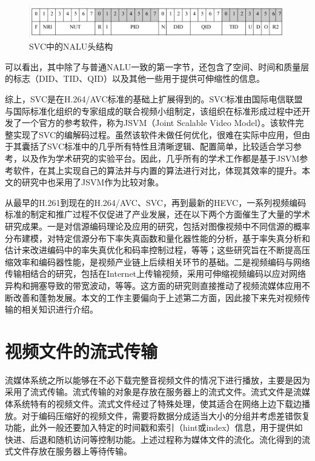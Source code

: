 \begin{figure}[h]
	\centering
	\includegraphics[width = 1.0\linewidth]{clip/05.png}
	\caption{SVC中的NALU头结构\label{fig:05}}
\end{figure}

可以看出，其中除了与普通NALU一致的第一字节，还包含了空间、时间和质量层的标志（DID、TID、QID）以及其他一些用于提供可伸缩性的信息。

综上，SVC是在H.264/AVC标准的基础上扩展得到的。SVC标准由国际电信联盟与国际标准化组织的专家组成的联合视频小组制定，该组织在标准形成过程中还开发了一个官方的参考软件，称为JSVM（Joint Scalable Video Model）\supercite{JSVM}。该软件完整实现了SVC的编解码过程。虽然该软件未做任何优化，很难在实际中应用，但由于其囊括了SVC标准中的几乎所有特性且清晰逻辑、配置简单，比较适合学习参考，以及作为学术研究的实验平台。因此，几乎所有的学术工作都是基于JSVM参考软件，在其上实现自己的算法并与内置的算法进行对比，体现其效率的提升。本文的研究中也采用了JSVM作为比较对象。

从最早的H.261到现在的H.264/AVC、SVC，再到最新的HEVC，一系列视频编码标准的制定和推广过程不仅促进了产业发展，还在以下两个方面催生了大量的学术研究成果。一是对信源编码理论及应用的研究，包括对图像视频中不同信源的概率分布建模\supercite{Birney-TIP1995, Lam-TIP2000, Sharifi-TCSVT1995, Kamaci-TCSVT2005}，对特定信源分布下率失真函数和量化器性能的分析\supercite{He-TCSVT2001, Gary-TIT1996, Gary-VCIP2005}，基于率失真分析和估计来改进编码中的率失真优化和码率控制过程\supercite{Gary-SPM1998, Lin-TCSVT1998, Sun-TCSVT2006, Lee-TCSVT2014}，等等；这些研究旨在不断提高压缩效率和编码器性能，是视频产业链上后续相关环节的基础。二是视频编码与网络传输相结合的研究\supercite{Sun-book-2001}，包括在Internet上传输视频\supercite{Wu-TCSVT2001, Conklin-TCSVT2001}，采用可伸缩视频编码以应对网络异构和拥塞导致的带宽波动\supercite{Wu-IEEE2001, Ohm-IEEE2005}，等等。这方面的研究则直接推动了视频流媒体应用不断改善和蓬勃发展。本文的工作主要偏向于上述第二方面，因此接下来先对视频传输的相关知识进行介绍。

\section{视频文件的流式传输}

流媒体系统之所以能够在不必下载完整音视频文件的情况下进行播放，主要是因为采用了流式传输。流式传输的对象是存放在服务器上的流式文件。流式文件是流媒体系统特有的视频文件。流式文件经过了特殊处理，使其适合在网络上边下载边播放。对于编码压缩好的视频文件，需要将数据分成适当大小的分组并考虑差错恢复功能，此外一般还要加入特定的时间戳和索引（hint或index）信息，用于提供如快进、后退和随机访问等控制功能。上述过程称为媒体文件的流化。流化得到的流式文件存放在服务器上等待传输。

